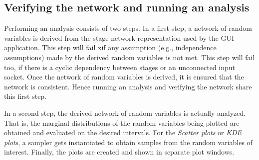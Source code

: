 \subsection{Verifying the network and running an analysis}
Performing an analysis consists of two steps. In a first step, a network of random variables is derived from the stage-network representation used by the GUI application. This step will fail xif any assumption (e.g., independence assumptions) made by the derived random variables is not met. This step will fail too, if there is a cyclic dependency between stages or an unconnected input socket. Once the network of random variables is derived, it is ensured that the network is consistent. Hence running an analysis and verifying the network share this first step. 

In a second step, the derived network of random variables is actually analyzed. That is, the marginal distributions of the random variables being plotted are obtained and evaluated on the desired intervals. For the \emph{Scatter plots} or \emph{KDE plots}, a sampler gets instantiated to obtain samples from the random variables of interest. Finally, the plots are created and shown in separate plot windows.